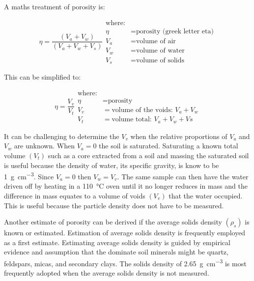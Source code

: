 \documentclass[letterpaper, 12pt]{article}
\begin{document}
A maths treatment of porosity is:

\begin{equation}
    \eta = \frac{\left(V_a + V_w\right)}{\left(V_a + V_w + V_s\right)}
    \begin{aligned}
        \text{where:}                              \\
        \eta &= \text{porosity (greek letter eta)} \\
        V_a &= \text{volume of air}                \\
        V_w &= \text{volume of water}              \\
        V_s &= \text{volume of solids}
    \end{aligned}
\end{equation}

This can be simplified to:

\begin{equation}
    \eta = \frac{V_v}{V_t}
    \begin{aligned}
        \text{where:}                               \\
        \eta &= \text{porosity}                     \\
        V_v &= \text{volume of the voids}:\,V_a+V_w \\
        V_t &= \text{volume total}:\,V_a+V_w+Vs
    \end{aligned}
\end{equation}

It can be challenging to determine the $V_v$ when the relative proportions of $V_a$ and $V_w$ are unknown. When $V_a = 0$ the soil is saturated. Saturating a known total volume $\left(V_t\right)$  such as a core extracted from a soil and massing the saturated soil is useful because the density of water, its specific gravity, is know to be \qty[per-mode = symbol]{1}{\gram\per\cubic\centi\metre}. Since $V_a=0$ then $V_w=V_v$. The same sample can then have the water driven off by heating in a \qty{110}{\degreeCelsius} oven until it no longer reduces in mass and the difference in mass equates to a volume of voids $\left(V_v\right)$ that the water occupied. This is useful because the particle density does not have to be measured.

Another estimate of porosity can be derived if the average solids density $\left(\rho_s\right)$ is known or estimated. Estimation of average solids density is frequently employed as a first estimate. Estimating average solids density is guided by empirical evidence and assumption that the dominate soil minerals might be quartz, feldspars, micas, and secondary clays. The solids density of \qty[per-mode = symbol]{2.65}{\gram\per\cubic\centi\metre} is most frequently adopted when the average solids density is not measured.
\end{document}
